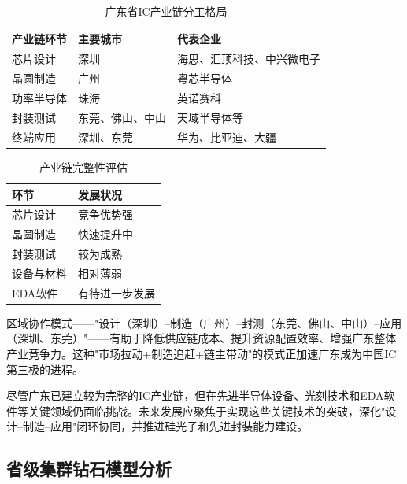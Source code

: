\documentclass[12pt,a4paper]{article}
\newcommand{\tableHeaderRow}{\rowcolor{tealPrimary}\color{white}}
\newcommand{\tableOddRow}{\rowcolor{mintBG}}
\newcommand{\tableEvenRow}{\rowcolor{white}}
\begin{document}
\begin{table}[H]
\centering
\caption{广东省IC产业链分工格局}
\label{tab:chain_division}
\begin{tabular}{p{3cm}p{4cm}p{6cm}}
\toprule
\tableHeaderRow
\textbf{产业链环节} & \textbf{主要城市} & \textbf{代表企业} \\
\midrule
\tableOddRow 芯片设计 & 深圳 & 海思、汇顶科技、中兴微电子 \\
\tableEvenRow 晶圆制造 & 广州 & 粤芯半导体 \\
\tableOddRow 功率半导体 & 珠海 & 英诺赛科 \\
\tableEvenRow 封装测试 & 东莞、佛山、中山 & 天域半导体等 \\
\tableOddRow 终端应用 & 深圳、东莞 & 华为、比亚迪、大疆 \\
\bottomrule
\end{tabular}
\end{table}

\begin{table}[H]
\centering
\caption{产业链完整性评估}
\label{tab:chain_completeness}
\begin{tabular}{p{4.5cm}p{8.5cm}}
\toprule
\tableHeaderRow
\textbf{环节} & \textbf{发展状况} \\
\midrule
\tableOddRow 芯片设计 & 竞争优势强 \\
\tableEvenRow 晶圆制造 & 快速提升中 \\
\tableOddRow 封装测试 & 较为成熟 \\
\tableEvenRow 设备与材料 & 相对薄弱 \\
\tableOddRow EDA软件 & 有待进一步发展 \\
\bottomrule
\end{tabular}
\end{table}

区域协作模式——"设计（深圳）--制造（广州）--封测（东莞、佛山、中山）--应用（深圳、东莞）"——有助于降低供应链成本、提升资源配置效率、增强广东整体产业竞争力。这种"市场拉动+制造追赶+链主带动"的模式正加速广东成为中国IC第三极的进程。

尽管广东已建立较为完整的IC产业链，但在先进半导体设备、光刻技术和EDA软件等关键领域仍面临挑战。未来发展应聚焦于实现这些关键技术的突破，深化"设计--制造--应用"闭环协同，并推进硅光子和先进封装能力建设。

\subsection{省级集群钻石模型分析}
\label{sec:provincial_cluster}
\end{document}
